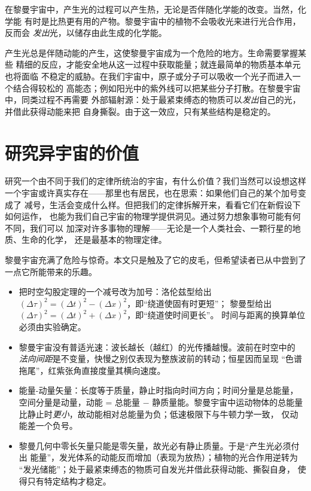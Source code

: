 在黎曼宇宙中，产生光的过程可以产生热，无论是否伴随化学能的改变。当然，化学能
有时是比热更有用的产物。黎曼宇宙中的植物不会吸收光来进行光合作用，反而会
\emph{发出}光，以储存由此生成的化学能。

产生光总是伴随动能的产生，这使黎曼宇宙成为一个危险的地方。生命需要掌握某些
精细的反应，才能安全地从这一过程中获取能量；就连最简单的物质基本单元也将面临
不稳定的威胁。在我们宇宙中，原子或分子可以吸收一个光子而进入一个结合得较松的
高能态；例如阳光中的紫外线可以把某些分子打散。在黎曼宇宙中，同类过程不再需要
外部辐射源：处于最紧束缚态的物质可以\emph{发出}自己的光，并借此获得动能来把
自身撕裂。由于这一效应，只有某些结构是稳定的。

\section{研究异宇宙的价值}

研究一个由不同于我们的定律所统治的宇宙，有什么价值？我们当然可以设想这样
一个宇宙或许真实存在——那里也有居民，也在思索：如果他们自己的某个加号变成了
减号，生活会变成什么样。但把我们的定律拆解开来，看看它们在新假设下如何运作，
也能为我们自己宇宙的物理学提供洞见。通过努力想象事物可能有何不同，我们可以
加深对许多事物的理解——无论是一个人类社会、一颗行星的地质、生命的化学，
还是最基本的物理定律。

黎曼宇宙充满了危险与惊奇。本文只是触及了它的皮毛，但希望读者已从中尝到了
一点它所能带来的乐趣。

\begin{keybox}[本章要点]
\begin{itemize}
  \item 把时空勾股定理的一个减号改为加号：洛伦兹型给出
        $(\Delta\tau)^2=(\Delta t)^2-(\Delta x)^2$，即“绕道使固有时更短”；
        黎曼型给出 $(\Delta\tau)^2=(\Delta t)^2+(\Delta x)^2$，即“绕道使时间更长”。
        时间与距离的换算单位必须由实验确定。
  \item 黎曼宇宙没有普适光速：波长越长（越红）的光传播越慢。波前在时空中的
        \emph{法向间距}是不变量，快慢之别仅表现为整族波前的转动；恒星因而呈现
        “色谱拖尾”，红紫张角直接度量其横向速度。
  \item 能量-动量矢量：长度等于质量，静止时指向时间方向；时间分量是总能量，
        空间分量是动量，动能 = 总能量 $-$ 静质量能。黎曼宇宙中运动物体的总能量
        比静止时\emph{更小}，故动能相对总能量为负；低速极限下与牛顿力学一致，
        仅动能差一个负号。
  \item 黎曼几何中零长矢量只能是零矢量，故光必有静止质量。于是“产生光必须付出
        能量”，发光体系的动能反而增加（表现为放热）；植物的光合作用逆转为
        “发光储能”；处于最紧束缚态的物质可自发光并借此获得动能、撕裂自身，
        使得只有特定结构才稳定。
\end{itemize}
\end{keybox}
